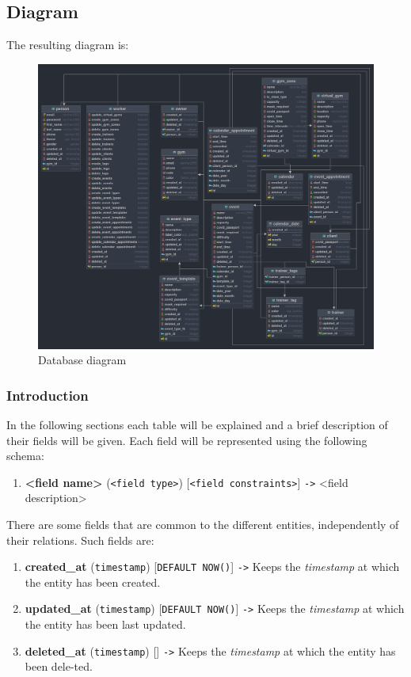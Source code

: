 \documentclass[a4paper, 12pt, oneside]{book}
\begin{document}
\subsection{Diagram}
The resulting diagram is:
\begin{figure}[H]
	\centering
	\includegraphics[width=\textwidth]{assets/db-erd.png}
	\caption{Database diagram}
\end{figure}
\subsubsection{Introduction}
In the following sections each table will be explained and a brief description of their fields will be given. Each field will be represented using the following schema:
\begin{enumerate}[label = -]
	\item \textbf{<field name>} (\texttt{<field type>}) [\texttt{<field constraints>}] \texttt{->} <field description>
\end{enumerate}
There are some fields that are common to the different entities, independently of their relations. Such fields are:
\begin{enumerate}[label = -]
	\item \textbf{created\_at} (\texttt{timestamp}) [\texttt{DEFAULT NOW()}] \texttt{->} Keeps the \emph{timestamp} at which the entity has been created.
	\item \textbf{updated\_at} (\texttt{timestamp}) [\texttt{DEFAULT NOW()}] \texttt{->} Keeps the \emph{timestamp} at which the entity has been last updated.
	\item \textbf{deleted\_at} (\texttt{timestamp}) [] \texttt{->} Keeps the \emph{timestamp} at which the entity has been dele-ted.
\end{enumerate}
\end{document}
